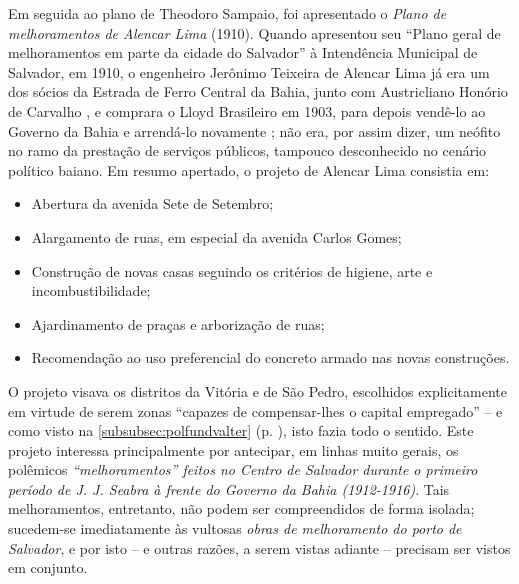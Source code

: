 Em seguida ao plano de Theodoro Sampaio, foi apresentado o \textit{Plano de melhoramentos de Alencar Lima} (1910). Quando apresentou seu ``Plano geral de melhoramentos em parte da cidade do Salvador'' à Intendência Municipal de Salvador, em 1910, o engenheiro Jerônimo Teixeira de Alencar Lima já era um dos sócios da Estrada de Ferro Central da Bahia, junto com Austricliano Honório de Carvalho \cite{souza_trabalholivre_2011}, e comprara o Lloyd Brasileiro em 1903, para depois vendê-lo ao Governo da Bahia e arrendá-lo novamente \cite[p.~220]{CUNHA2011}; não era, por assim dizer, um neófito no ramo da prestação de serviços públicos, tampouco desconhecido no cenário político baiano. Em resumo apertado, o projeto de Alencar Lima consistia em:

\begin{itemize}
\item Abertura da avenida Sete de Setembro;
\item Alargamento de ruas, em especial da avenida Carlos Gomes;
\item Construção de novas casas seguindo os critérios de higiene, arte e incombustibilidade;
\item Ajardinamento de praças e arborização de ruas;
\item Recomendação ao uso preferencial do concreto armado nas novas construções.
\end{itemize}

O projeto visava os distritos da Vitória e de São Pedro, escolhidos explicitamente em virtude de serem zonas ``capazes de compensar-lhes o capital empregado'' \cite[p.~95]{CUNHA2011} -- e como visto na \autoref{subsubsec:polfundvalter} (p. \pageref{subsubsec:polfundvalter}), isto fazia todo o sentido. Este projeto interessa principalmente por antecipar, em linhas muito gerais, os polêmicos \textit{``melhoramentos'' feitos no Centro de Salvador durante o primeiro período de J. J. Seabra à frente do Governo da Bahia (1912-1916)}. Tais melhoramentos, entretanto, não podem ser compreendidos de forma isolada; sucedem-se imediatamente às vultosas \textit{obras de melhoramento do porto de Salvador}, e por isto -- e outras razões, a serem vistas adiante -- precisam ser vistos em conjunto.

